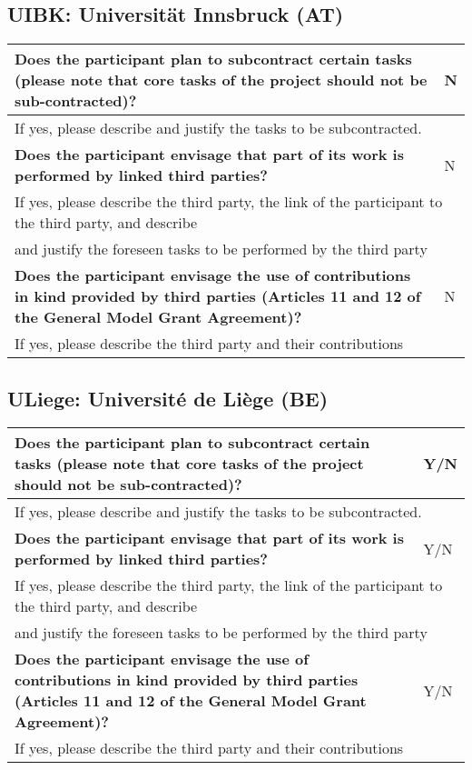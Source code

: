 \subsection{UIBK: Universität Innsbruck (AT)}

\begin{longtable}{|p{}|p{}|}
\hline
{\bf Does the participant plan to subcontract certain tasks (please
  note that core tasks of the project should not be sub-contracted)?}
&
N
\\
\hline
\multicolumn{2}{|l|}{
If yes, please describe and justify the tasks to be subcontracted.}
\\
\hline
{\bf Does the participant envisage that  part of its work is performed
  by linked third parties?}
&
N
\\
\hline
\multicolumn{2}{|l|}{If yes, please describe the third party, the link of the
  participant to the third party, and describe}\\
\multicolumn{2}{|l|}{and justify the foreseen
tasks to be performed by the third party}
\\
\hline
{\bf Does the participant envisage the use of contributions in kind
provided by third parties (Articles 11 and 12 of the General Model
Grant Agreement)?}
&
N
\\
\hline
\multicolumn{2}{|l|}{If yes, please describe the third party and their contributions}
\\
\hline
\end{longtable}

\subsection{ULiege: Université de Liège (BE)}

\begin{longtable}{|p{}|p{}|}
\hline
{\bf Does the participant plan to subcontract certain tasks (please
  note that core tasks of the project should not be sub-contracted)?}
&
Y/N
\\
\hline
\multicolumn{2}{|l|}{
If yes, please describe and justify the tasks to be subcontracted.}
\\
\hline
{\bf Does the participant envisage that  part of its work is performed
  by linked third parties?}
&
Y/N
\\
\hline
\multicolumn{2}{|l|}{If yes, please describe the third party, the link of the
  participant to the third party, and describe}\\
\multicolumn{2}{|l|}{and justify the foreseen
tasks to be performed by the third party}
\\
\hline
{\bf Does the participant envisage the use of contributions in kind
provided by third parties (Articles 11 and 12 of the General Model
Grant Agreement)?}
&
Y/N
\\
\hline
\multicolumn{2}{|l|}{If yes, please describe the third party and their contributions}
\\
\hline
\end{longtable}

